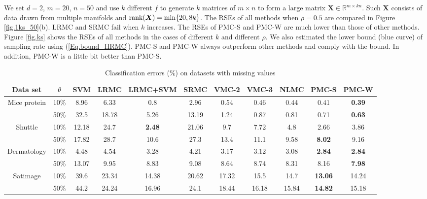 \documentclass[letterpaper]{article} %
\begin{document}
We set $d=2$, $m=20$, $n=50$ and use $k$ different $f$ to generate $k$ matrices of $m\times n$ to form a large matrix $\bm{X}\in\mathbb{R}^{m\times kn}$. Such $\bm{X}$ consists of data drawn from multiple manifolds and $\textup{rank}(\bm{X})=\min\lbrace 20,8k\rbrace$. The RSEs of all methods when $\rho=0.5$ are compared in Figure \ref{fig.1ks_50}(b). LRMC and SRMC fail when $k$ increases. The RSEs of PMC-S and PMC-W are much lower than those of other methods. Figure \ref{fig.ks} shows the RSEs of all methods in the cases of different $k$ and different $\rho$. We also estimated the lower bound (blue curve) of sampling rate using (\ref{Eq.bound_HRMC}). PMC-S and PMC-W always outperform other methods and comply with the bound. In addition, PMC-W is a little bit better than PMC-S.

\begin{table}
\centering
\small
\caption{Classification errors ($\%$) on datasets with missing values}\label{Tab_class_results}
\begin{tabular}{ccccccccccc}
\hline
{Data set}	&	{$\theta$}	 & SVM & LRMC & {\scriptsize LRMC+SVM} & SRMC & VMC-2 	& VMC-3 & NLMC & PMC-S & PMC-W \\ \hline
\multirow{2}{*}{Mice protein}&10\% 	&8.96 	&6.33	&0.8	&2.96  &0.54	&0.46	&0.44	&0.41	&\textbf{0.39}		\\
						&50\% 		&32.5	&18.78	&5.26	&13.19  &1.24	&0.87	&0.81	&0.71	&\textbf{0.63}	\\ \hline

\multirow{2}{*}{Shuttle}&10\% 		&12.18 	&24.7	&\textbf{2.48}	&21.06 &9.7		&7.72	&4.8	&2.66		&3.86		\\
						&50\% 		&17.82	&28.7	&10.6		&27.3  &13.4	&11.1	&9.58	&\textbf{8.02}	&9.16	\\ \hline

\multirow{2}{*}{Dermatology}&10\% 	&4.48 	&4.54	&3.28	&4.21    &3.17	&3.12	&3.08	&\textbf{2.84}	&\textbf{2.84}		\\
						&50\% 		&13.07	&9.95	&8.83	&9.08  &8.64	&8.74	&8.31	&8.16	&\textbf{7.98}	\\ \hline

\multirow{2}{*}{Satimage}&10\% 		&39.6 	&23.34	&14.38	&20.62  &17.32	&15.5	&14.7	&\textbf{13.06}	&14.24		\\
						&50\% 		&44.2	&24.24	&16.96	&24.1  &18.44	&16.18	&15.84	&\textbf{14.82}	&15.18	\\ \hline
\end{tabular}
\end{table}
\end{document}
